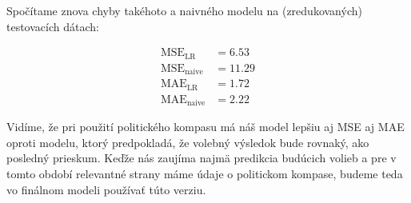 \documentclass[report.tex]{subfiles}
\begin{document}
Spočítame znova chyby takéhoto a naivného modelu na (zredukovaných) testovacích dátach:

\begin{align*}
	\operatorname{MSE}_{\operatorname{LR}} &= 6.53 \\
	\operatorname{MSE}_{\operatorname{naive}} &= 11.29 \\
	\operatorname{MAE}_{\operatorname{LR}} &= 1.72 \\
	\operatorname{MAE}_{\operatorname{naive}} &= 2.22
\end{align*}

Vidíme, že pri použití politického kompasu má náš model lepšiu aj MSE aj MAE oproti modelu, ktorý predpokladá, že volebný výsledok bude rovnaký, ako posledný prieskum. Keďže nás zaujíma najmä predikcia budúcich volieb a pre v tomto období relevantné strany máme údaje o politickom kompase, budeme teda vo finálnom modeli používať túto verziu.
\end{document}
